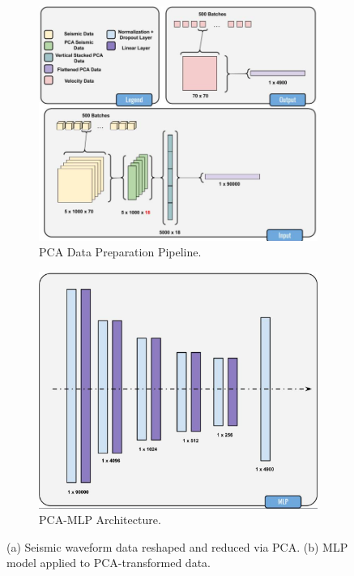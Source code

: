 \documentclass{article}
\begin{document}
\begin{figure}
    \centering
    \begin{subfigure}[b]{0.4\linewidth}
        \centering
        \includegraphics[width=\linewidth]{figures/PCA1.png}
        \caption{PCA Data Preparation Pipeline.}
    \end{subfigure}
    \hfill
    \begin{subfigure}[b]{0.4\linewidth}
        \centering
        \includegraphics[width=\linewidth]{figures/PCA2.png}
        \caption{PCA-MLP Architecture.}
    \end{subfigure}
    \caption{(a) Seismic waveform data reshaped and reduced via PCA. (b) MLP model applied to PCA-transformed data.}
    \label{fig:pca}
\end{figure}
\end{document}

